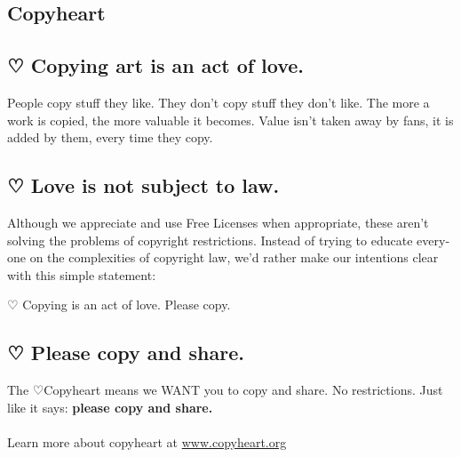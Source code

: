 \newpage
\begin{english}
\section*{Copyheart}

\subsection*{ {\dejavu ♡} Copying art is an act of love.}

People copy stuff they like. They don’t copy stuff they don’t like. The more a work is copied, the more valuable it becomes. Value isn’t taken away by fans, it is added by them, every time they copy.

\subsection*{ {\dejavu ♡} Love is not subject to law.}

Although we appreciate and use Free Licenses when appropriate, these aren’t solving the problems of copyright restrictions. Instead of trying to educate everyone on the complexities of copyright law, we’d rather make our intentions clear with this simple statement:

\begin{framed}
   \begin{center} {\dejavu ♡} Copying is an act of love. Please copy. \end{center}
\end{framed}

\subsection*{ {\dejavu ♡} Please copy and share.}

The {\dejavu ♡}Copyheart means we WANT you to copy and share. No restrictions. Just like it says: \textbf{please copy and share.}\\
 \\
Learn more about copyheart at \url{www.copyheart.org}
\end{english}

